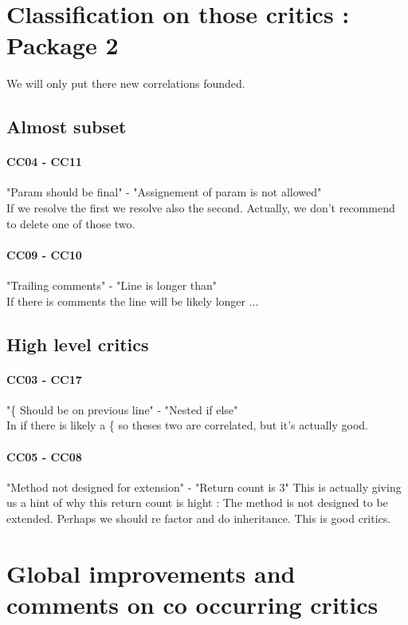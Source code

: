 \documentclass{article}
\begin{document}
\section{Classification on those critics : Package 2}
We will only put there new correlations founded.

\subsection{Almost subset}
\paragraph{CC04 - CC11}
 "Param should be final" - "Assignement of param is not allowed"  \\
If we resolve the first we resolve also the second. Actually, we don't recommend to delete one of those two.

\paragraph{CC09 - CC10}
 "Trailing comments" - "Line is longer than" \\
If there is comments the line will be likely longer ...

\subsection{High level critics}
\paragraph{CC03 - CC17} 
"\{ Should be on previous line" -  "Nested if else" \\
In if there is likely a \{ so theses two are correlated, but it's actually good.

\paragraph{CC05 - CC08} 
 "Method not designed for extension" - "Return count is 3"
This is actually giving us a hint of why this return count is hight : The method is not designed to be extended. Perhaps we should re factor and do inheritance. This is good critics.


\section{Global improvements and comments on co occurring critics} 
\end{document}
